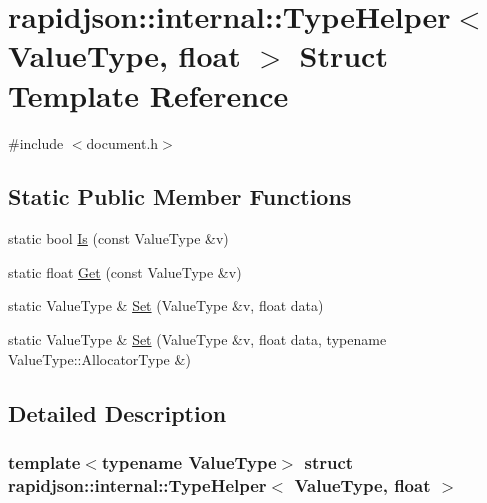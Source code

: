 \hypertarget{structrapidjson_1_1internal_1_1_type_helper_3_01_value_type_00_01float_01_4}{}\section{rapidjson\+::internal\+::Type\+Helper$<$ Value\+Type, float $>$ Struct Template Reference}
\label{structrapidjson_1_1internal_1_1_type_helper_3_01_value_type_00_01float_01_4}


{\ttfamily \#include $<$document.\+h$>$}

\subsection*{Static Public Member Functions}
\begin{DoxyCompactItemize}
\item 
static bool \mbox{\hyperlink{structrapidjson_1_1internal_1_1_type_helper_3_01_value_type_00_01float_01_4_a65b4dc15b6b04930393e6195f3864899}{Is}} (const Value\+Type \&v)
\item 
static float \mbox{\hyperlink{structrapidjson_1_1internal_1_1_type_helper_3_01_value_type_00_01float_01_4_aec2fb2546200035d9f6fb5f54b3acd32}{Get}} (const Value\+Type \&v)
\item 
static Value\+Type \& \mbox{\hyperlink{structrapidjson_1_1internal_1_1_type_helper_3_01_value_type_00_01float_01_4_ad3257d54813e8a95416bc1de39cc6641}{Set}} (Value\+Type \&v, float data)
\item 
static Value\+Type \& \mbox{\hyperlink{structrapidjson_1_1internal_1_1_type_helper_3_01_value_type_00_01float_01_4_adcaba5b282d76c8c7f3c9194cdcfa477}{Set}} (Value\+Type \&v, float data, typename Value\+Type\+::\+Allocator\+Type \&)
\end{DoxyCompactItemize}


\subsection{Detailed Description}
\subsubsection*{template$<$typename Value\+Type$>$\newline
struct rapidjson\+::internal\+::\+Type\+Helper$<$ Value\+Type, float $>$}



